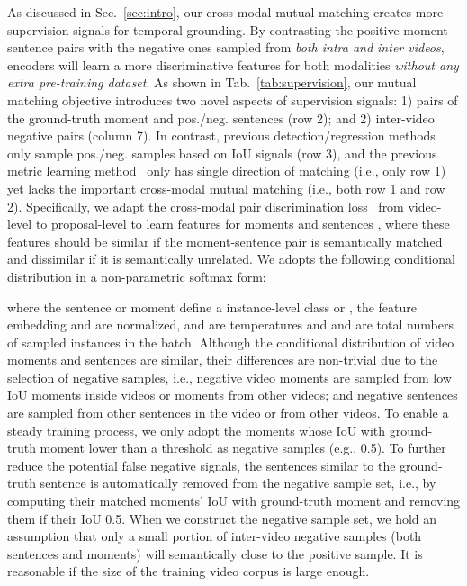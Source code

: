 \documentclass[letterpaper]{article} \usepackage{aaai22}  \usepackage{times}  \usepackage{helvet}  \usepackage{courier}  \usepackage[hyphens]{url}  \usepackage{graphicx} \urlstyle{rm} \def\UrlFont{\rm}  \usepackage{natbib}  \usepackage{caption} \DeclareCaptionStyle{ruled}{labelfont=normalfont,labelsep=colon,strut=off} \frenchspacing  \setlength{\pdfpagewidth}{8.5in}  \setlength{\pdfpageheight}{11in}  \usepackage{algorithm}
\begin{document}
 As discussed in Sec.~\ref{sec:intro}, our cross-modal mutual matching creates more supervision signals for temporal grounding. By contrasting the positive moment-sentence pairs with the negative ones sampled from {\em both intra and inter videos}, encoders will learn a more discriminative features for both modalities {\em without any extra pre-training dataset}. As shown in Tab.~\ref{tab:supervision}, our mutual matching objective introduces two novel aspects of supervision signals: 1) pairs of the ground-truth moment and pos./neg. sentences (row 2); and 2) inter-video negative pairs (column 7). In contrast, previous detection/regression methods only sample pos./neg. samples based on IoU signals (row 3), and the previous metric learning method~\cite{DBLP:conf/iccv/HendricksWSSDR17} only has single direction of matching (i.e., only row 1) yet lacks the important cross-modal mutual matching (i.e., both row 1 and row 2). Specifically, we adapt the cross-modal pair discrimination loss~\cite{DBLP:journals/corr/abs-2001-05691} from video-level to proposal-level to learn features for moments  and sentences , where these features should be similar if the moment-sentence pair is semantically matched and dissimilar if it is semantically unrelated. We adopts the following conditional distribution in a non-parametric softmax form:
\begin{small}

\end{small}
where the  sentence or moment define a instance-level class  or , the feature embedding  and  are  normalized,  and  are temperatures and  and  are total numbers of sampled instances in the batch. Although the conditional distribution of video moments and sentences are similar, their differences are non-trivial due to the selection of negative samples, i.e.,  negative video moments are sampled from low IoU moments inside videos or moments from other videos; and  negative sentences are sampled from other sentences in the video or from other videos. To enable a steady training process, we only adopt the moments whose IoU with ground-truth moment lower than a threshold as negative samples (e.g.,  0.5). To further reduce the potential false negative signals, the sentences similar to the ground-truth sentence is automatically removed from the negative sample set, i.e., by computing their matched moments' IoU with ground-truth moment and removing them if their IoU  0.5. When we construct the negative sample set, we hold an assumption that only a small portion of inter-video negative samples (both sentences and moments) will semantically close to the positive sample. It is reasonable if the size of the training video corpus is large enough.
\end{document}
